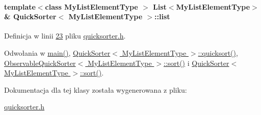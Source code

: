 \hypertarget{class_quick_sorter_a60a7a4772c958f256962294418e83fe4}{
\paragraph[{list}]{\setlength{\rightskip}{0pt plus 5cm}template$<$class My\-List\-Element\-Type $>$ {\bf List}$<$My\-List\-Element\-Type$>$\& {\bf Quick\-Sorter}$<$ My\-List\-Element\-Type $>$\-::list}}\label{class_quick_sorter_a60a7a4772c958f256962294418e83fe4}


Definicja w linii \hyperlink{quicksorter_8h_source_l00023}{23} pliku \hyperlink{quicksorter_8h_source}{quicksorter.\-h}.



Odwołania w \hyperlink{main_8cpp_source_l00022}{main()}, \hyperlink{quicksorter_8h_source_l00042}{Quick\-Sorter$<$ My\-List\-Element\-Type $>$\-::quicksort()}, \hyperlink{observablequicksorter_8h_source_l00026}{Observable\-Quick\-Sorter$<$ My\-List\-Element\-Type $>$\-::sort()} i \hyperlink{quicksorter_8h_source_l00069}{Quick\-Sorter$<$ My\-List\-Element\-Type $>$\-::sort()}.



Dokumentacja dla tej klasy została wygenerowana z pliku\-:\begin{DoxyCompactItemize}
\item 
\hyperlink{quicksorter_8h}{quicksorter.\-h}\end{DoxyCompactItemize}
